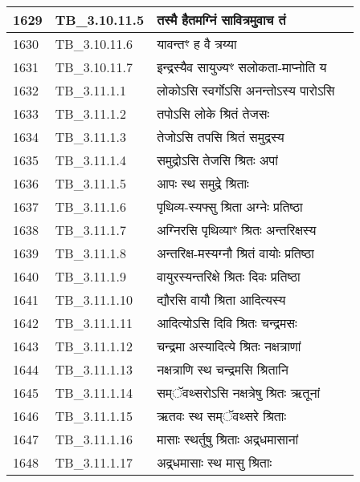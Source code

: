 \documentclass[17pt]{extarticle}
\begin{document}
\begin{longtable}{||p{0.4in}||p{0.9in}||p{4.0in}||p{0.9in}||}
        \hline
            1629 & TB\_3.10.11.5 & तस्मै हैतमग्निं सावित्रमुवाच तं &      \\
        \hline
            1630 & TB\_3.10.11.6 & यावन्तꣳ ह वै त्रय्या &      \\
        \hline
            1631 & TB\_3.10.11.7 & इन्द्रस्यैव सायुज्यꣳ सलोकता{-}माप्नोति य &      \\
        \hline
            1632 & TB\_3.11.1.1 & लोकोऽसि स्वर्गोऽसि अनन्तोऽस्य पारोऽसि &      \\
        \hline
            1633 & TB\_3.11.1.2 & तपोऽसि लोके श्रितं तेजसः &      \\
        \hline
            1634 & TB\_3.11.1.3 & तेजोऽसि तपसि श्रितं समुद्रस्य &      \\
        \hline
            1635 & TB\_3.11.1.4 & समुद्रोऽसि तेजसि श्रितः अपां &      \\
        \hline
            1636 & TB\_3.11.1.5 & आपः स्थ समुद्रे श्रिताः &      \\
        \hline
            1637 & TB\_3.11.1.6 & पृथिव्य{-}स्यफ्सु श्रिता अग्नेः प्रतिष्ठा &      \\
        \hline
            1638 & TB\_3.11.1.7 & अग्निरसि पृथिव्याꣳ श्रितः अन्तरिक्षस्य &      \\
        \hline
            1639 & TB\_3.11.1.8 & अन्तरिक्ष{-}मस्यग्नौ श्रितं वायोः प्रतिष्ठा &      \\
        \hline
            1640 & TB\_3.11.1.9 & वायुरस्यन्तरिक्षे श्रितः दिवः प्रतिष्ठा &      \\
        \hline
            1641 & TB\_3.11.1.10 & द्यौरसि वायौ श्रिता आदित्यस्य &      \\
        \hline
            1642 & TB\_3.11.1.11 & आदित्योऽसि दिवि श्रितः चन्द्रमसः &      \\
        \hline
            1643 & TB\_3.11.1.12 & चन्द्रमा अस्यादित्ये श्रितः नक्षत्राणां &      \\
        \hline
            1644 & TB\_3.11.1.13 & नक्षत्राणि स्थ चन्द्रमसि श्रितानि &      \\
        \hline
            1645 & TB\_3.11.1.14 & सम्ॅवथ्सरोऽसि नक्षत्रेषु श्रितः ऋतूनां &      \\
        \hline
            1646 & TB\_3.11.1.15 & ऋतवः स्थ सम्ॅवथ्सरे श्रिताः &      \\
        \hline
            1647 & TB\_3.11.1.16 & मासाः स्थर्तुषु श्रिताः अद्र्धमासानां &      \\
        \hline
            1648 & TB\_3.11.1.17 & अद्र्धमासाः स्थ मासु श्रिताः &      \\

\end{longtable}
\end{document}
